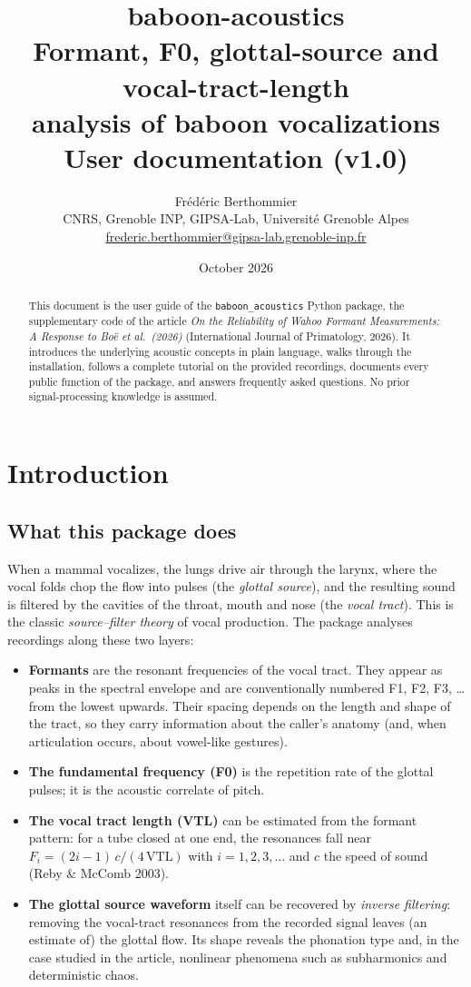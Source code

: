 \documentclass[11pt,a4paper]{article}
\title{\vspace{-1.2cm}\textbf{baboon-acoustics}\\[2mm]
\large Formant, F0, glottal-source and vocal-tract-length\\
analysis of baboon vocalizations\\[4mm]
\normalsize User documentation (v1.0)}
\author{Fr\'ed\'eric Berthommier\\[1mm]
\normalsize CNRS, Grenoble INP, GIPSA-Lab, Universit\'e Grenoble Alpes\\[0.5mm]
\normalsize \href{mailto:frederic.berthommier@gipsa-lab.grenoble-inp.fr}{frederic.berthommier@gipsa-lab.grenoble-inp.fr}}
\date{October 2026}
\newcommand{\pkg}{\texttt{baboon\_acoustics}}
\begin{document}
\maketitle

\begin{abstract}
\noindent This document is the user guide of the \pkg{} Python package,
the supplementary code of the article \emph{On the Reliability of Wahoo
Formant Measurements: A Response to Bo\"e et al.\ (2026)} (International
Journal of Primatology, 2026). It introduces the underlying acoustic
concepts in plain language, walks through the installation, follows a
complete tutorial on the provided recordings, documents every public
function of the package, and answers frequently asked questions. No
prior signal-processing knowledge is assumed.
\end{abstract}

\tableofcontents

\section{Introduction}

\subsection{What this package does}

When a mammal vocalizes, the lungs drive air through the larynx, where
the vocal folds chop the flow into pulses (the \emph{glottal source}),
and the resulting sound is filtered by the cavities of the throat, mouth
and nose (the \emph{vocal tract}). This is the classic
\emph{source--filter theory} of vocal production. The package analyses
recordings along these two layers:

\begin{itemize}
\item \textbf{Formants} are the resonant frequencies of the vocal tract.
They appear as peaks in the spectral envelope and are conventionally
numbered F1, F2, F3, \ldots{} from the lowest upwards. Their spacing
depends on the length and shape of the tract, so they carry information
about the caller's anatomy (and, when articulation occurs, about
vowel-like gestures).
\item \textbf{The fundamental frequency (F0)} is the repetition rate of
the glottal pulses; it is the acoustic correlate of pitch.
\item \textbf{The vocal tract length (VTL)} can be estimated from the
formant pattern: for a tube closed at one end, the resonances fall near
$F_i = (2i-1)\,c / (4\,\mathrm{VTL})$ with $i = 1, 2, 3, \ldots$ and $c$
the speed of sound (Reby \& McComb 2003).
\item \textbf{The glottal source waveform} itself can be recovered by
\emph{inverse filtering}: removing the vocal-tract resonances from the
recorded signal leaves (an estimate of) the glottal flow. Its shape
reveals the phonation type and, in the case studied in the article,
nonlinear phenomena such as subharmonics and deterministic chaos.
\end{itemize}
\end{document}
